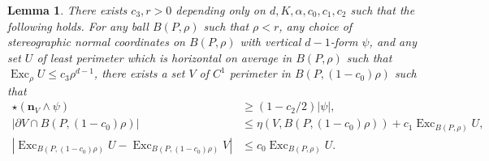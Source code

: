 \documentclass[reqno,10pt]{amsart}
\DeclareMathOperator{\Exc}{Exc}
\newcommand{\normal}{\mathbf n}
\newtheorem{lemma}[theorem]{Lemma}
\theoremstyle{definition}
\numberwithin{equation}{section}
\begin{document}
\begin{lemma}\label{single mollify}
There exists $c_3, r > 0$ depending only on $d, K, \alpha, c_0, c_1, c_2$ such that the following holds.
For any ball $B(P, \rho)$ such that $\rho < r$, any choice of stereographic normal coordinates on $B(P, \rho)$ with vertical $d-1$-form $\psi$, and any set $U$ of least perimeter which is horizontal on average in $B(P, \rho)$ such that $\Exc_\rho U \leq c_3\rho^{d - 1}$, there exists a set $V$ of $C^1$ perimeter in $B(P, (1 - c_0)\rho)$ such that
\begin{align}
\star(\normal_V \wedge \psi) &\geq (1 - c_2/2)|\psi|, \label{single mollify normal}\\
|\partial V \cap B(P, (1 - c_0)\rho)| &\leq \eta(V, B(P, (1 - c_0)\rho)) + c_1 \Exc_{B(P, \rho)} U, \label{single mollify minimality} \\
|\Exc_{B(P, (1 - c_0)\rho)} U - \Exc_{B(P, (1 - c_0) \rho)} V| &\leq c_0 \Exc_{B(P, \rho)} U. \label{single mollify excess}
\end{align}
\end{lemma}
\end{document}
